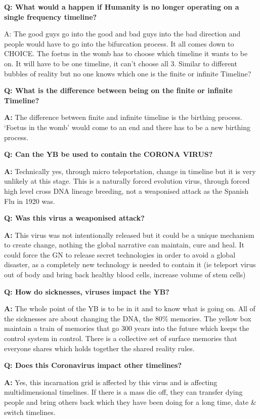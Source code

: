 \textbf{Q: What would a happen if Humanity is no longer operating on a
single frequency timeline?}

A: The good guys go into the good and bad guys into the bad direction
and people would have to go into the bifurcation process. It all comes
down to CHOICE. The foetus in the womb has to choose which timeline it
wants to be on. It will have to be one timeline, it can't choose all 3.
Similar to different bubbles of reality but no one knows which one is
the finite or infinite Timeline?

\textbf{Q: What is the difference between being on the finite or
infinite Timeline?}

\textbf{A:} The difference between finite and infinite timeline is the
birthing process. `Foetus in the womb' would come to an end and there
has to be a new birthing process.

\textbf{Q: Can the YB be used to contain the CORONA VIRUS?}

\textbf{A:} Technically yes, through micro teleportation, change in
timeline but it is very unlikely at this stage. This is a naturally
forced evolution virus, through forced high level cross DNA lineage
breeding, not a weaponised attack as the Spanish Flu in 1920 was.

\textbf{Q: Was this virus a weaponised attack?}

\textbf{A:} This virus was not intentionally released but it could be a
unique mechanism to create change, nothing the global narrative can
maintain, cure and heal. It could force the GN to release secret
technologies in order to avoid a global disaster, as a completely new
technology is needed to contain it (ie teleport virus out of body and
bring back healthy blood cells, increase volume of stem cells)

\textbf{Q: How do sicknesses, viruses impact the YB?}

\textbf{A:} The whole point of the YB is to be in it and to know what is
going on. All of the sicknesses are about changing the DNA, the 80\%
memories. The yellow box maintain a train of memories that go 300 years
into the future which keeps the control system in control. There is a
collective set of surface memories that everyone shares which holds
together the shared reality rules.

\textbf{Q: Does this Coronavirus impact other timelines?}

\textbf{A:} Yes, this incarnation grid is affected by this virus and is
affecting multidimensional timelines. If there is a mass die off, they
can transfer dying people and bring others back which they have been
doing for a long time, date \& switch timelines.

